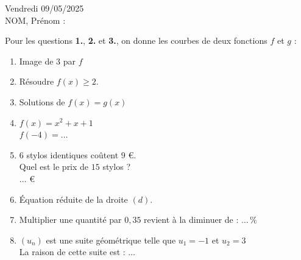 \documentclass[a4paper,11pt,landscape,exos]{nsi} %
\begin{document}
\begin{multicols}{2}

\textcolor{UGLiBlue}{
        Vendredi 09/05/2025\\
        NOM, Prénom :}\\
    \maketitle


    Pour les questions \textbf{1.}, \textbf{2.} et \textbf{3.}, on donne les courbes de deux fonctions $f$ et $g$ :\\
    
    \def\xmin{-1}\def\xmax{5}\def\ymin{-1}\def\ymax{5}
	\def\F{-(\x-2)^2+3}
    \def\G{(\x-1)*(\x-4)*(-\x+3)+2}
    
    

\begin{enumerate}[itemsep=.9em]
    \item Image de $3$ par $f$
    \item Résoudre $f(x)\geqslant 2$.
    \item Solutions de $f(x)=g(x)$
    \item $f(x)=x^2+x+1$\\$f(-4)=\ldots$
	\item $6$ stylos identiques coûtent $9$ €. \\
        Quel est le prix de $15$ stylos ? \\$\ldots$ €
	\item Équation réduite de la droite $(d)$.\\
	\def\xmin{-4}\def\xmax{4}\def\ymin{-4}\def\ymax{2}
	\def\F{\x/3-2}
    \item Multiplier une quantité par $0{,}35$ revient à la diminuer de : $\ldots\,\%$
	\item $(u_n)$ est une suite géométrique telle que $u_1=-1$ et $u_2=3$\\La raison de cette suite est :  $\ldots$
	

\end{enumerate}
\end{multicols}
\end{document}
